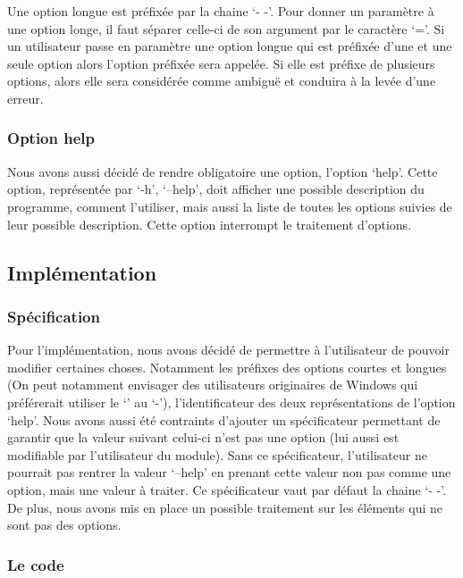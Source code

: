 \documentclass[12pt]{article}
\begin{document}
    Une option longue est préfixée par la chaine `- -'. Pour donner un paramètre 
    à une option longe, il faut séparer celle-ci de son argument par le caractère `='. 
    Si un utilisateur passe en paramètre une option longue qui est préfixée 
    d'une et une seule option alors l'option préfixée sera appelée. Si elle est 
    préfixe de plusieurs options, alors elle sera considérée comme ambiguë et 
    conduira à la levée d'une erreur.

    \subsubsection{Option help}

    Nous avons aussi décidé de rendre obligatoire une option, l'option `help'.
    Cette option, représentée par `-h', `--help', doit afficher une possible 
    description du programme, comment l'utiliser, mais aussi la liste de toutes 
    les options suivies de leur possible description. Cette option interrompt le 
    traitement d'options. 

    \subsection{Implémentation}

    \subsubsection{Spécification}

    Pour l'implémentation, nous avons décidé de permettre à l'utilisateur de 
    pouvoir modifier certaines choses. Notamment les préfixes des options courtes 
    et longues (On peut notamment envisager des utilisateurs originaires de 
    Windows qui préférerait utiliser le `' au `-'), l'identificateur des deux 
    représentations de l'option `help'. Nous avons aussi été contraints 
    d'ajouter un spécificateur permettant de garantir que la valeur suivant 
    celui-ci n'est pas une option (lui aussi est modifiable par l'utilisateur du
    module). Sans ce spécificateur, l'utilisateur ne pourrait pas rentrer la 
    valeur `--help' en prenant cette valeur non pas comme une option, mais une 
    valeur à traiter. Ce spécificateur vaut par défaut la chaine `- -'. De plus, 
    nous avons mis en place un possible traitement sur les éléments qui ne sont 
    pas des options.
    
    \subsubsection{Le code}
\end{document}
